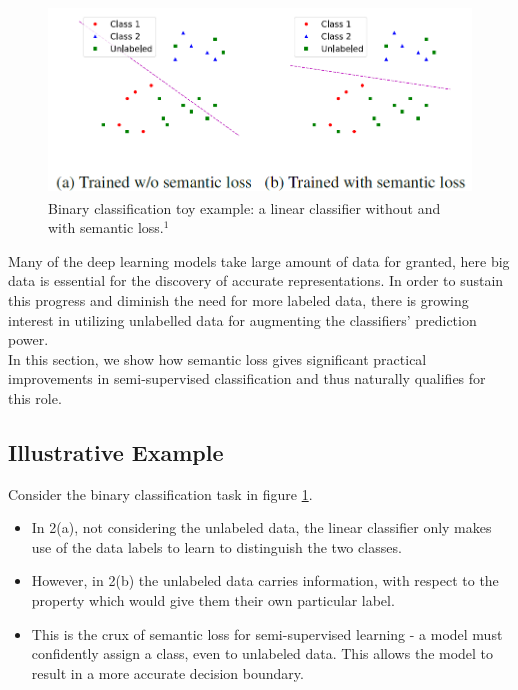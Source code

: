 \documentclass[12pt]{article}
\begin{document}
\begin{figure}[htp]
    \centering
    \includegraphics[width=12cm, height=5cm]{image2}
    \caption{Binary classification toy example: a linear classifier without and with semantic loss.$^1$}
    \label{image2}
\end{figure}
Many of the deep learning models take large amount of data for granted, here big data is essential for the discovery of accurate representations. In order to sustain this progress and diminish the need for more labeled data, there is growing interest in utilizing unlabelled data for augmenting the classifiers' prediction power.\\ In this section, we show how semantic loss gives significant practical improvements in semi-supervised classification and thus naturally qualifies for this role.

\subsection{Illustrative Example}
Consider the binary classification task in figure \ref{image2}. 
\begin{itemize}
    \item In 2(a), not considering the unlabeled data, the linear classifier only makes use of the data labels to learn to distinguish the two classes.
    \item However, in 2(b) the unlabeled data carries information, with respect to the property which would give them their own particular label.
    \item This is the crux of semantic loss for semi-supervised learning - a model must confidently assign a class, even to unlabeled data. This allows the model to result in a more accurate decision boundary.
\end{itemize}
\end{document}
